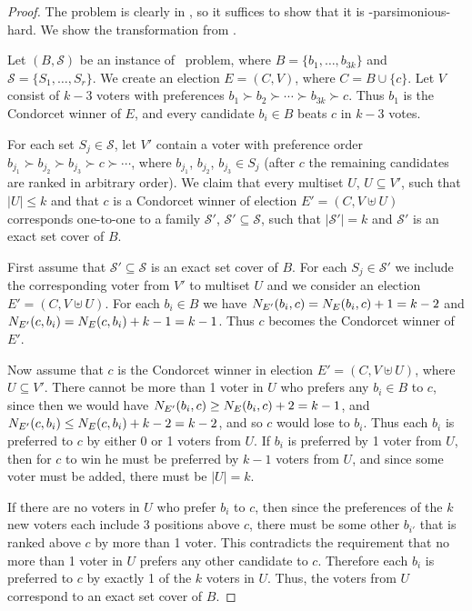 \begin{proof}
The problem is clearly in \sharpPclass, so it suffices to show that it is \sharpPclass-parsimonious-hard.
We show the transformation from \sharpXthreeC.

Let $(B,\mathcal{S})$ be an instance of \sharpXthreeC\ problem, where $B=\{b_1,\dots,b_{3k}\}$ and $\mathcal{S}=\{S_1,\dots,S_r\}$.
We create an election $E=(C,V)$, where $C=B\cup\{c\}$.
Let $V$ consist of $k-3$ voters with preferences $b_1\succ b_2\succ\cdots\succ b_{3k}\succ c$.
Thus $b_1$ is the Condorcet winner of $E$, and every candidate $b_i\in B$ beats $c$ in $k-3$ votes.

For each set $S_j\in\mathcal{S}$, let $V'$ contain a voter with preference order $b_{j_1}\succ b_{j_2}\succ b_{j_3}\succ c\succ\cdots$, where $b_{j_1}$, $b_{j_2}$, $b_{j_3}\in S_j$ (after $c$ the remaining candidates are ranked in arbitrary order).
We claim that every multiset $U$, $U\subseteq V'$, such that $|U|\le k$ and that $c$ is a Condorcet winner of election $E'=(C,V\uplus U)$ corresponds one-to-one to a family $\mathcal{S'}$, $\mathcal{S'}\subseteq\mathcal{S}$, such that $|\mathcal{S'}|=k$ and $\mathcal{S'}$ is an exact set cover of $B$.

First assume that $\mathcal{S'}\subseteq\mathcal{S}$ is an exact set cover of $B$.
For each $S_j\in\mathcal{S'}$ we include the corresponding voter from $V'$ to multiset $U$ and we consider an election $E'=(C,V\uplus U)$.
For each $b_i\in B$ we have $N_{E'}(b_i,c)=N_{E}(b_i,c)+1=k-2$ and $N_{E'}(c,b_i)=N_{E}(c,b_i)+k-1=k-1$.
Thus $c$ becomes the Condorcet winner of $E'$.

Now assume that $c$ is the Condorcet winner in election $E'=(C,V\uplus U)$, where $U\subseteq V'$.
There cannot be more than 1 voter in $U$ who prefers any $b_i\in B$ to $c$, since then we would have $N_{E'}(b_i,c)\ge N_{E}(b_i,c)+2=k-1$, and $N_{E'}(c,b_i)\le N_{E}(c,b_i)+k-2=k-2$, and so $c$ would lose to $b_i$.
Thus each $b_i$ is preferred to $c$ by either 0 or 1 voters from $U$.
If $b_i$ is preferred by 1 voter from $U$, then for $c$ to win he must be preferred by $k-1$ voters from $U$, and since some voter must be added, there must be $|U|=k$.

If there are no voters in $U$ who prefer $b_i$ to $c$, then since the preferences of the $k$ new voters each include 3 positions above $c$, there must be some other $b_{i'}$ that is ranked above $c$ by more than 1 voter.
This contradicts the requirement that no more than 1 voter in $U$ prefers any other candidate to $c$.
Therefore each $b_i$ is preferred to $c$ by exactly 1 of the $k$ voters in $U$.
Thus, the voters from $U$ correspond to an exact set cover of $B$.
\end{proof}

